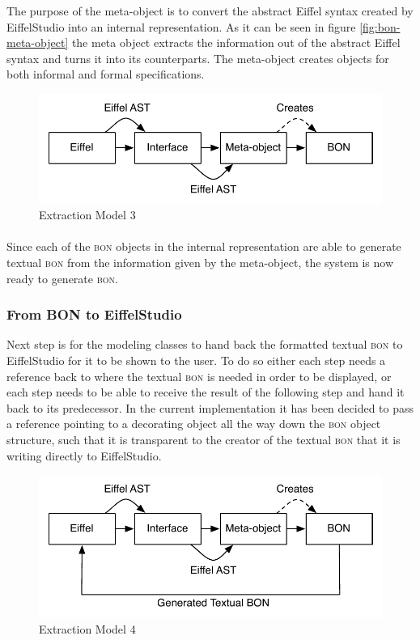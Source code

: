 The purpose of the meta-object is to convert the abstract Eiffel syntax created by EiffelStudio into an internal \bon{} representation. As it can be seen in figure \ref{fig:bon-meta-object} the meta object extracts the information out of the abstract Eiffel syntax and turns it into its \bon{} counterparts. The meta-object creates objects for both informal and formal specifications.

\begin{figure}[H]
\centering
\includegraphics[scale=0.8]{images/BON-extraction-model-3.pdf}
\caption{\bon{} Extraction Model 3}
\label{fig:bon_extraction_3}
\end{figure}

\paragraph{}
Since each of the \textsc{bon} objects in the internal representation are able to generate textual \textsc{bon} from the information given by the meta-object, the system is now ready to generate \textsc{bon}.

\subsubsection{From BON to EiffelStudio}
Next step is for the modeling classes to hand back the formatted textual \textsc{bon} to EiffelStudio for it to be shown to the user. To do so either each step needs a reference back to where the textual \textsc{bon} is needed in order to be displayed, or each step needs to be able to receive the result of the following step and hand it back to its predecessor. In the current implementation it has been decided to pass a reference pointing to a decorating object all the way down the \textsc{bon} object structure, such that it is transparent to the creator of the textual \textsc{bon} that it is writing directly to EiffelStudio.

\begin{figure}[H]
\centering
\includegraphics[scale=0.8]{images/BON-extraction-model-4.pdf}
\caption{\bon{} Extraction Model 4}
\label{fig:bon_extraction_4}
\end{figure}


